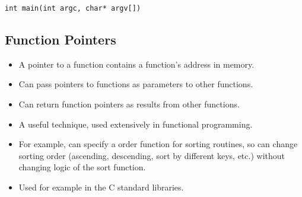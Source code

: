 \documentclass[11pt]{article}
\begin{document}
\begin{verbatim}
int main(int argc, char* argv[])
\end{verbatim}
\subsection{Function Pointers}
\label{sec-3-3}

\begin{itemize}
\item A pointer to a function contains a function's address in memory.
\item Can pass pointers to functions as parameters to other functions.
\item Can return function pointers as results from other functions.
\item A useful technique, used extensively in functional programming.
\item For example, can specify a order function for sorting routines, so
  can change sorting order (ascending, descending, sort by different keys, etc.)
  without changing logic of the sort function.
\item Used for example in the C standard libraries.
\end{itemize}
\end{document}
